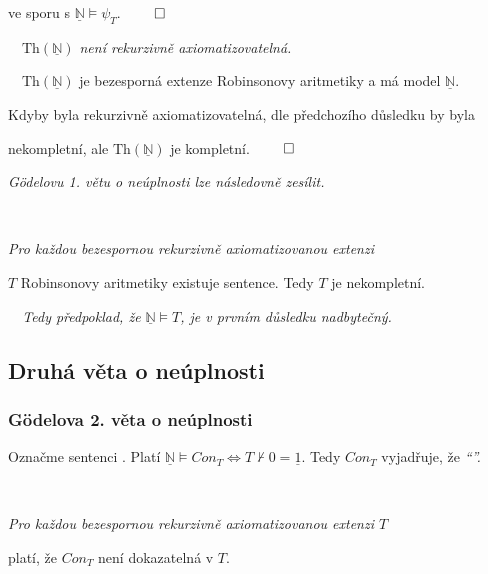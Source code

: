     ve sporu s $\underline{\mathbb{N}}\models \psi_T$. $\qed$
    \bigskip
    
    \ \ {\it $\mathrm{Th}(\underline{\mathbb{N}})$ není rekurzivně axiomatizovatelná.}
    \medskip
    
    \ \ $\mathrm{Th}(\underline{\mathbb{N}})$ je bezesporná extenze Robinsonovy aritmetiky a má model $\underline{\mathbb{N}}$.
    \smallskip
    
    Kdyby byla rekurzivně axiomatizovatelná, dle předchozího důsledku by byla
    \smallskip
    
    nekompletní, ale $\mathrm{Th}(\underline{\mathbb{N}})$ je kompletní. $\qed$
    \bigskip
    
    {\it Gödelovu 1. větu o neúplnosti lze následovně zesílit.}
    \medskip
    
    \ \ {\it Pro každou bezespornou rekurzivně axiomatizovanou extenzi
    \smallskip
    
    $T$ Robinsonovy aritmetiky existuje  sentence. Tedy $T$ je nekompletní.}
    
    
    {\it {}\ \ Tedy předpoklad, že $\underline{\mathbb{N}}\models T$, je v prvním důsledku nadbytečný.}
    

\subsection{Druhá věta o neúplnosti}\todo

\subsubsection*{Gödelova 2. věta o neúplnosti}
    
    Označme  sentenci .
    \smallskip
    Platí $\underline{\mathbb{N}}\models Con_T \Leftrightarrow T\not\vdash 0=\underline{1}$. Tedy $Con_T$ vyjadřuje, že {\it ``''.}
    \medskip
    
    \smallskip
    
    \ \ {\it Pro každou bezespornou rekurzivně axiomatizovanou extenzi $T$
    
     platí, že $Con_T$ není dokazatelná v $T$.}
    \medskip
    
    \smallskip
    
